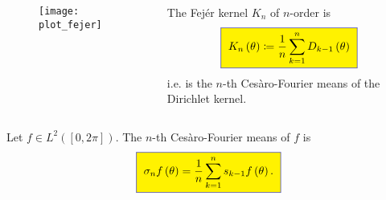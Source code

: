 \begin{frame}
	\frametitle{\secname}

	\begin{columns}
		\begin{column}{0.42\textwidth}
			\begin{figure}
				\centering
				\texttt{[image: plot\_fejer]}
			\end{figure}
		\end{column}
		\begin{column}{0.54\textwidth}
			\begin{definition}
				The \alert{Fejér kernel} $K_{n}$ of $n$-order is
				\begin{equation*}
					\fcolorbox{DarkBlue}{yellow}{
						\begin{math}
							\displaystyle
							K_{n}\left(\theta\right)\coloneqq
							\frac{1}{n}
							\sum_{k=1}^{n}D_{k-1}\left(\theta\right)
						\end{math}
					}
				\end{equation*}
				i.e. is the $n$-th Cesàro-Fourier means of the Dirichlet
				kernel.
			\end{definition}
		\end{column}
	\end{columns}

	\begin{definition}
		Let
		\begin{math}
			f\in L^{2}\left(\left[0,2\pi\right]\right)
		\end{math}.
		The \alert{$n$-th Cesàro-Fourier means} of $f$ is
		\begin{equation*}
			\fcolorbox{DarkBlue}{yellow}{
				\begin{math}
					\displaystyle
					\sigma_{n}f\left(\theta\right)=
					\frac{1}{n}\sum_{k=1}^{n}
					s_{k-1}f\left(\theta\right).
				\end{math}
			}
		\end{equation*}
	\end{definition}
\end{frame}

